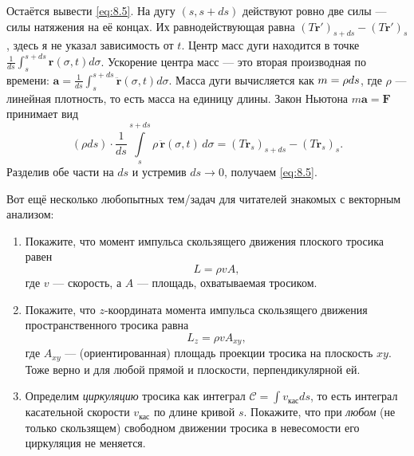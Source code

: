 Остаётся вывести \eqref{eq:8.5}.
На дугу $(s, s+ds)$ действуют ровно две силы --- силы натяжения на её концах.
Их равнодействующая равна
$(T \mathbf{r}')_{s+ds} - (T \mathbf{r}')_s$,
здесь я не указал зависимость от $t$.
Центр масс дуги находится в точке $
\tfrac{1}{ds} \int_s^{s+ds} \mathbf{r}(\sigma, t) d\sigma$.
Ускорение центра масс --- это вторая производная по времени:
$\mathbf{a} = \tfrac{1}{ds} \int_s^{s+ds} \ddot{\mathbf{r}}(\sigma, t) d\sigma$.
Масса дуги вычисляется как $m \z= \rho ds$, где $\rho$ --- линейная плотность, то есть масса на единицу длины.
Закон Ньютона $m\mathbf{a} = \mathbf{F}$ принимает вид
\begin{equation}
(\rho ds)
\cdot
\frac{1}{ds}
\int\limits_s^{s+ds}
\rho\,\ddot{\mathbf{r}}(\sigma, t)\, d\sigma
= (T \mathbf{r}_s)_{s+ds} - (T \mathbf{r}_s)_s .
\end{equation}
Разделив обе части на $ds$ и устремив $ds \to 0$, получаем \eqref{eq:8.5}.

\medskip

Вот ещё несколько любопытных тем/задач для читателей знакомых с векторным анализом:

\begin{enumerate}
\item Покажите, что момент импульса скользящего движения плоского тросика равен
\begin{equation}
L = \rho v A ,
\end{equation}
где $v$ --- скорость, а $A$ --- площадь, охватываемая тросиком.
\item Покажите, что $z$-координата момента импульса скользящего движения пространственного тросика равна
\begin{equation}
L_z = \rho v A_{xy},
\end{equation}
где $A_{xy}$ --- (ориентированная) площадь проекции тросика на плоскость $xy$.
Тоже верно и для любой прямой и плоскости, перпендикулярной ей.
\item Определим \emph{циркуляцию} тросика как интеграл
$\mathcal{C} = \int v_{\text{кас}} ds$,
то есть интеграл касательной скорости $v_{\text{кас}}$ по длине кривой $s$.
Покажите, что при \emph{любом} (не только скользящем) свободном движении тросика в невесомости
его циркуляция не меняется.
\end{enumerate}

